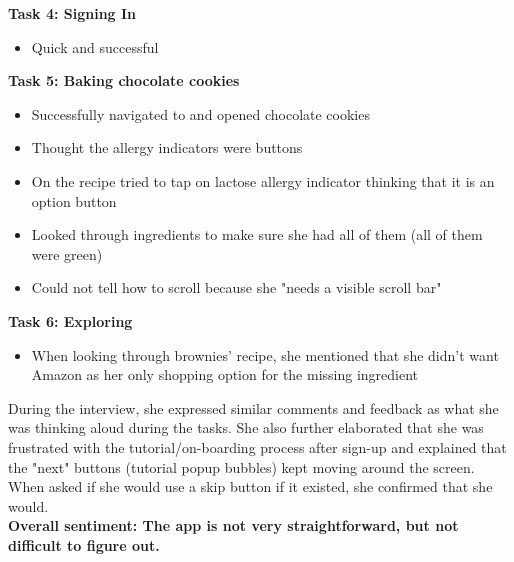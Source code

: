\documentclass[manuscript, screen, nonacm]{acmart}
\begin{document}
\textbf{Task 4: Signing In}
\begin{itemize}
    \item Quick and successful
\end{itemize}
\textbf{Task 5: Baking chocolate cookies}
\begin{itemize}
    \item Successfully navigated to and opened chocolate cookies
    \item Thought the allergy indicators were buttons
    \item On the recipe tried to tap on lactose allergy indicator thinking that it is an option button
    \item Looked through ingredients to make sure she had all of them (all of them were green)
    \item Could not tell how to scroll because she "needs a visible scroll bar"
\end{itemize}
\textbf{Task 6: Exploring}
\begin{itemize}
    \item When looking through brownies' recipe, she mentioned that she didn’t want Amazon as her only shopping option for the missing ingredient
\end{itemize}
During the interview, she expressed similar comments and feedback as what she was thinking aloud during the tasks. She also further elaborated that she was frustrated with the tutorial/on-boarding process after sign-up and explained that the "next" buttons (tutorial popup bubbles) kept moving around the screen. When asked if she would use a skip button if it existed, she confirmed that she would.\\
\textbf{Overall sentiment: The app is not very straightforward, but not difficult to figure out.}
\end{document}
